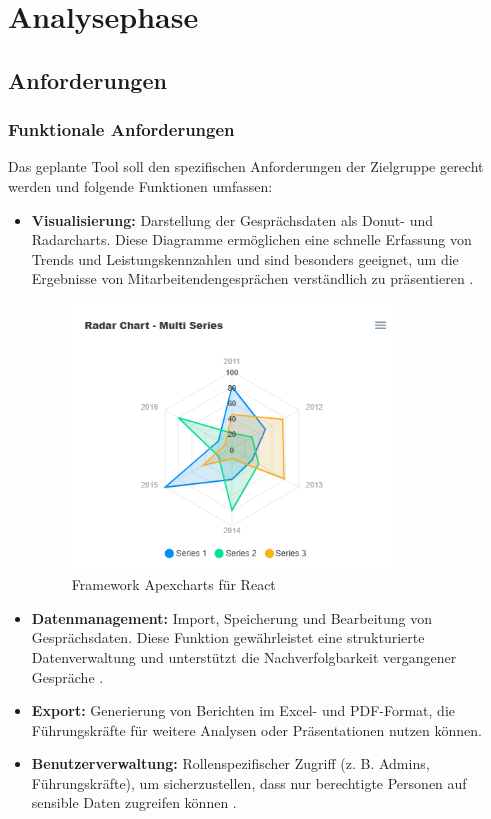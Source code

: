 \chapter{Analysephase}
\label{chap:analysephase}

\section{Anforderungen}
\subsection{Funktionale Anforderungen}
Das geplante Tool soll den spezifischen Anforderungen der Zielgruppe gerecht werden und folgende Funktionen umfassen:
\begin{itemize}
    \item \textbf{Visualisierung:} Darstellung der Gesprächsdaten als Donut- und Radarcharts. Diese Diagramme ermöglichen eine schnelle Erfassung von Trends und Leistungskennzahlen und sind besonders geeignet, um die Ergebnisse von Mitarbeitendengesprächen verständlich zu präsentieren \cite{kirk2016data, evergreen2016effective}.
    \begin{figure}[h!]
    \centering
    \includegraphics[width=0.8\textwidth]{images/radarchart_apexcharts.png}
    \caption{Framework Apexcharts für React}
    \label{fig:hrworks_evalea_comparison}
\end{figure}
    \item \textbf{Datenmanagement:} Import, Speicherung und Bearbeitung von Gesprächsdaten. Diese Funktion gewährleistet eine strukturierte Datenverwaltung und unterstützt die Nachverfolgbarkeit vergangener Gespräche \cite{bryson2011employee}.
    \item \textbf{Export:} Generierung von Berichten im Excel- und PDF-Format, die Führungskräfte für weitere Analysen oder Präsentationen nutzen können.
    \item \textbf{Benutzerverwaltung:} Rollenspezifischer Zugriff (z. B. Admins, Führungskräfte), um sicherzustellen, dass nur berechtigte Personen auf sensible Daten zugreifen können \cite{duarte2012performance}.
\end{itemize}

